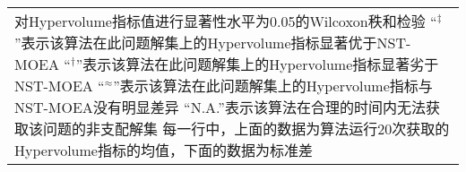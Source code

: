 {\begin{longtable}[c]{lccccccc}
    \bottomrule
    \multicolumn{8}{p{45em}}{
        对Hypervolume指标值进行显著性水平为0.05的Wilcoxon秩和检验\vspace{-.75em}\newline{}
        “$^\ddag$”表示该算法在此问题解集上的Hypervolume指标显著优于NST-MOEA\vspace{-.75em}\newline{}
        “$^\dag$”表示该算法在此问题解集上的Hypervolume指标显著劣于NST-MOEA\vspace{-.75em}\newline{}
        “$^\approx$”表示该算法在此问题解集上的Hypervolume指标与NST-MOEA没有明显差异\vspace{-.75em}\newline{}
        “N.A.”表示该算法在合理的时间内无法获取该问题的非支配解集\vspace{-.75em}\newline{}
        每一行中，上面的数据为算法运行20次获取的Hypervolume指标的均值，下面的数据为标准差
        }
\end{longtable}
}%
